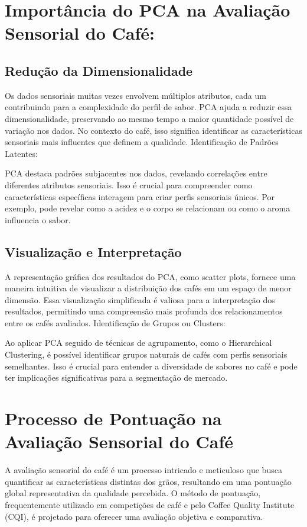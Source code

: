 \documentclass{article}
\begin{document}
\section{Importância do PCA na Avaliação Sensorial do Café:}

\subsection{Redução da Dimensionalidade}

Os dados sensoriais muitas vezes envolvem múltiplos atributos, cada um contribuindo para a complexidade do perfil de sabor. PCA ajuda a reduzir essa dimensionalidade, preservando ao mesmo tempo a maior quantidade possível de variação nos dados. No contexto do café, isso significa identificar as características sensoriais mais influentes que definem a qualidade.
Identificação de Padrões Latentes:

PCA destaca padrões subjacentes nos dados, revelando correlações entre diferentes atributos sensoriais. Isso é crucial para compreender como características específicas interagem para criar perfis sensoriais únicos. Por exemplo, pode revelar como a acidez e o corpo se relacionam ou como o aroma influencia o sabor.

\subsection{Visualização e Interpretação}

A representação gráfica dos resultados do PCA, como scatter plots, fornece uma maneira intuitiva de visualizar a distribuição dos cafés em um espaço de menor dimensão. Essa visualização simplificada é valiosa para a interpretação dos resultados, permitindo uma compreensão mais profunda dos relacionamentos entre os cafés avaliados.
Identificação de Grupos ou Clusters:

Ao aplicar PCA seguido de técnicas de agrupamento, como o Hierarchical Clustering, é possível identificar grupos naturais de cafés com perfis sensoriais semelhantes. Isso é crucial para entender a diversidade de sabores no café e pode ter implicações significativas para a segmentação de mercado.

\section{Processo de Pontuação na Avaliação Sensorial do Café}

A avaliação sensorial do café é um processo intricado e meticuloso que busca quantificar as características distintas dos grãos, resultando em uma pontuação global representativa da qualidade percebida. O método de pontuação, frequentemente utilizado em competições de café e pelo Coffee Quality Institute (CQI), é projetado para oferecer uma avaliação objetiva e comparativa.
\end{document}
